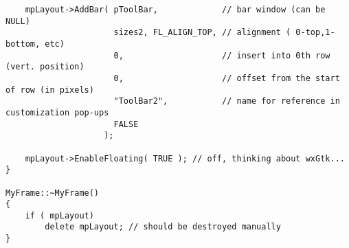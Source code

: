 \begin{verbatim}
    mpLayout->AddBar( pToolBar,             // bar window (can be NULL)
                      sizes2, FL_ALIGN_TOP, // alignment ( 0-top,1-bottom, etc)
                      0,                    // insert into 0th row (vert. position)
                      0,                    // offset from the start of row (in pixels)
                      "ToolBar2",           // name for reference in customization pop-ups
                      FALSE
                    );
    
    mpLayout->EnableFloating( TRUE ); // off, thinking about wxGtk...
}

MyFrame::~MyFrame()
{
    if ( mpLayout) 
        delete mpLayout; // should be destroyed manually
}
\end{verbatim}

